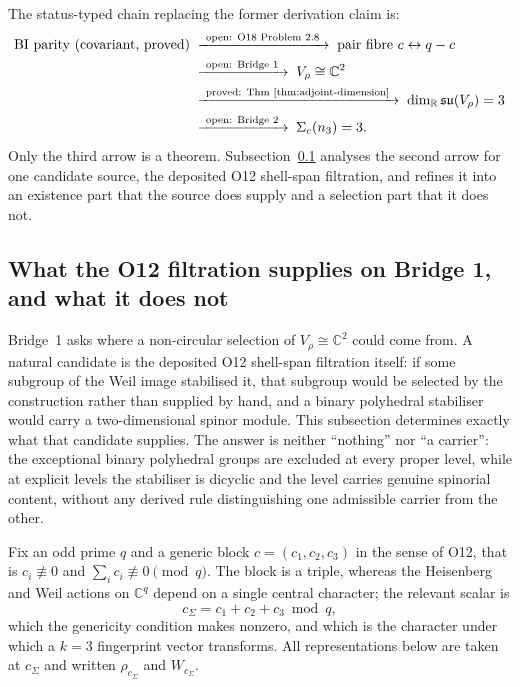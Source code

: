 \documentclass[11pt,a4paper]{article}
\newcommand{\su}{\mathfrak{su}}
\begin{document}
    The status-typed chain replacing the former derivation claim is:
    \begin{align}
      \label{eq:chain}
      \text{BI parity (covariant, proved)}
      &\;\xrightarrow{\ \text{open: O18 Problem 2.8}\ }\;
      \text{pair fibre } c \leftrightarrow q-c \notag\\
      &\;\xrightarrow{\ \text{open: Bridge 1}\ }\;
      V_{\rho} \cong \mathbb{C}^{2} \notag\\
      &\;\xrightarrow{\ \text{proved: Thm~\ref{thm:adjoint-dimension}}\ }\;
      \dim_{\mathbb{R}} \su(V_{\rho}) = 3 \notag\\
      &\;\xrightarrow{\ \text{open: Bridge 2}\ }\;
      \Sigma_{c}(n_{3}) = 3.
    \end{align}
    Only the third arrow is a theorem.
    Subsection~\ref{ssec:o12-obstruction} analyses the second arrow for one candidate source,
    the deposited O12 shell-span filtration, and refines it into an existence part that the
    source does supply and a selection part that it does not.

  \subsection{What the O12 filtration supplies on Bridge 1, and what it does not}
    \label{ssec:o12-obstruction}

    Bridge~1 asks where a non-circular selection of $V_{\rho} \cong \mathbb{C}^{2}$ could come
    from.
    A natural candidate is the deposited O12 shell-span filtration itself: if some subgroup of
    the Weil image stabilised it, that subgroup would be selected by the construction rather
    than supplied by hand, and a binary polyhedral stabiliser would carry a two-dimensional
    spinor module.
    This subsection determines exactly what that candidate supplies.
    The answer is neither ``nothing'' nor ``a carrier'': the exceptional binary polyhedral
    groups are excluded at every proper level, while at explicit levels the stabiliser is
    dicyclic and the level carries genuine spinorial content, without any derived rule
    distinguishing one admissible carrier from the other.

    Fix an odd prime $q$ and a generic block $c = (c_{1}, c_{2}, c_{3})$ in the sense of O12,
    that is $c_{i} \not\equiv 0$ and $\sum_{i} c_{i} \not\equiv 0 \pmod{q}$.
    The block is a triple, whereas the Heisenberg and Weil actions on $\mathbb{C}^{q}$ depend on
    a single central character; the relevant scalar is
    \[
      c_{\Sigma} = c_{1} + c_{2} + c_{3} \bmod q,
    \]
    which the genericity condition makes nonzero, and which is the character under which a
    $k = 3$ fingerprint vector transforms.
    All representations below are taken at $c_{\Sigma}$ and written $\rho_{c_{\Sigma}}$ and
    $W_{c_{\Sigma}}$.
\end{document}
